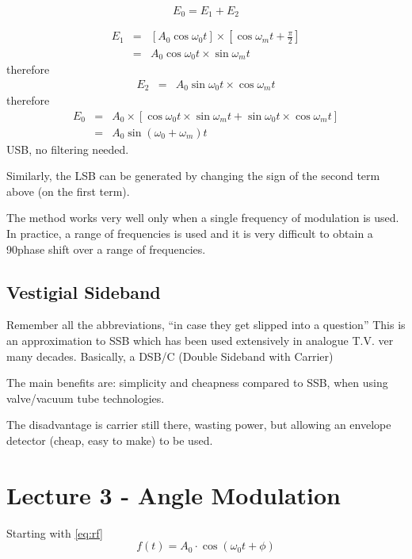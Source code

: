 \documentclass[11pt]{article} %
\begin{document}

	\begin{equation}
		E_0 = E_1+E_2
	\end{equation}

	\begin{eqnarray}
		E_1 &=& \left[ A_0 \cos{\omega_0 t}\right] \times \left[ \cos{\omega_m t + \frac{\pi}{2}}\right]\nonumber \\
		&=& A_0 \cos{\omega_0t}\times \sin{\omega_m t} 
	\end{eqnarray}
	therefore
	\begin{eqnarray}
		E_2 &=& A_0 \sin{\omega_0t}\times \cos{\omega_m t}
	\end{eqnarray}
	therefore
	\begin{eqnarray}
		E_0 &=& A_0 \times \left[\cos{\omega_0t}\times \sin{\omega_m t}+  \sin{\omega_0t}\times \cos{\omega_m t}\right] \nonumber \\
		&=& A_0 \sin{\left(\omega_0 + \omega_m\right)} t
	\end{eqnarray}
	USB, no filtering needed.

	Similarly, the LSB can be generated by changing the sign of the second term above (on the first term).

	The method works very well only when a single frequency of modulation is used. In practice, a range of frequencies is used and it is very difficult to obtain a 90\textdegree phase shift over a range of frequencies.

	\subsection{Vestigial Sideband}
		Remember all the abbreviations, ``in case they get slipped into a question''
		This is an approximation to SSB which has been used extensively in analogue T.V. ver many decades. Basically, a DSB/C (Double Sideband with Carrier)


		The main benefits are: simplicity and cheapness compared to SSB, when using valve/vacuum tube technologies.

		The disadvantage is carrier still there, wasting power, but allowing an envelope detector (cheap, easy to make) to be used.

\section{Lecture 3 - Angle Modulation}
	Starting with \ref{eq:rf}
	\begin{equation}
		f(t) = A_0 \cdot \cos\left(\omega_0t+\phi\right)
	\end{equation}
\end{document}
